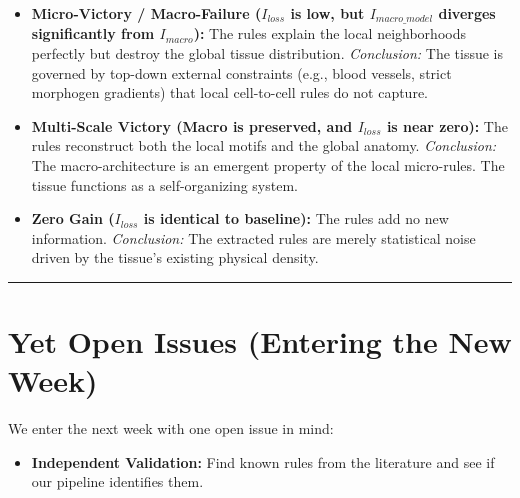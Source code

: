 \documentclass[10pt, a4paper]{article}
\begin{document}
\begin{itemize}
    \item \textbf{Micro-Victory / Macro-Failure ($I_{loss}$ is low, but $I_{macro\_model}$ diverges significantly from $I_{macro}$):} The rules explain the local neighborhoods perfectly but destroy the global tissue distribution. \textit{Conclusion:} The tissue is governed by top-down external constraints (e.g., blood vessels, strict morphogen gradients) that local cell-to-cell rules do not capture.
    
    \item \textbf{Multi-Scale Victory (Macro is preserved, and $I_{loss}$ is near zero):} The rules reconstruct both the local motifs and the global anatomy. \textit{Conclusion:} The macro-architecture is an emergent property of the local micro-rules. The tissue functions as a self-organizing system.
    
    \item \textbf{Zero Gain ($I_{loss}$ is identical to baseline):} The rules add no new information. \textit{Conclusion:} The extracted rules are merely statistical noise driven by the tissue's existing physical density.
\end{itemize}
\vspace{0.5cm}
\hrule
\vspace{0.5cm}



\section{Yet Open Issues (Entering the New Week)}
We enter the next week with one open issue in mind:

\begin{itemize}
\item \textbf{Independent Validation:} Find known rules from the literature and see if our pipeline identifies them.

\end{itemize}

\end{document}
